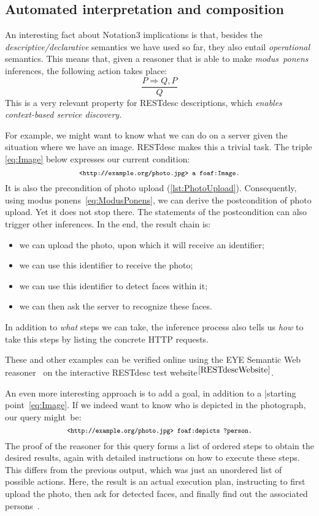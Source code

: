 \documentclass[smallextended]{svjour3}
\begin{document}
{\subsection{Automated interpretation and composition}
\label{Composition}
An interesting fact about Notation3 implications is that, besides the \emph{descriptive/declarative} semantics we have used so far, they also entail \emph{operational} semantics. This means that, given a reasoner that is able to make \emph{modus~ponens} inferences, the following action takes place:
\begin{equation}\label{eq:ModusPonens}
    \frac{P \Rightarrow Q, P}{Q}
\end{equation}
This is a very relevant property for RESTdesc descriptions, which \emph{enables context-based service discovery}.

For example, we might want to know what we can do on a server given the situation where we have an image. RESTdesc makes this a trivial task. The triple \ref{eq:Image} below expresses our current condition:
\begin{equation} \label{eq:Image}
    {\fontsize{8}{10}\texttt{<http://example.org/photo.jpg> a foaf:Image.}}
\end{equation}
It is also the precondition of photo upload (\autoref{lst:PhotoUpload}). Consequently, using modus ponens~\ref{eq:ModusPonens}, we can derive the postcondition of photo upload. Yet it does not stop there. The statements of the postcondition can also trigger other inferences. In the end, the result chain is:
\begin{itemize}
\item we can upload the photo, upon which it will receive an identifier;
\item we can use this identifier to receive the photo;
\item we can use this identifier to detect faces within it;
\item we can then ask the server to recognize these faces.
\end{itemize}
In addition to \emph{what} steps we can take, the inference process also tells us \emph{how} to take this steps by listing the concrete HTTP requests.

These and other examples can be verified online using the EYE Semantic Web reasoner~\cite{Euler} on the interactive RESTdesc test website$^{\ref{RESTdescWebsite}}$.

An even more interesting approach is to add a goal, in addition to a |starting point~\ref{eq:Image}. If we indeed want to know who is depicted in the photograph, our query might~be:
\begin{equation*}
    \fontsize{7.8}{10}\texttt{<http://example.org/photo.jpg> foaf:depicts ?person.}
\end{equation*}
The proof of the reasoner for this query forms a list of ordered steps to obtain the desired results, again with detailed instructions on how to execute these steps. This differs from the previous output, which was just an unordered list of possible actions. Here, the result is an actual execution plan, instructing to first upload the photo, then ask for detected faces, and finally find out the associated persons~\cite{Verborgh:2011p4792}.

}
\end{document}
